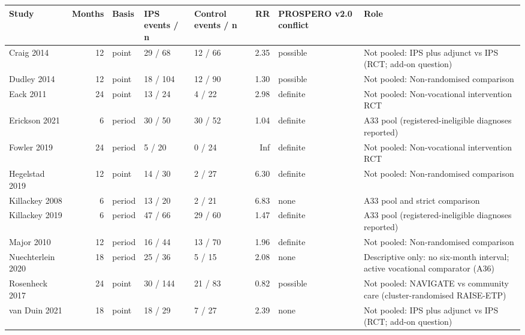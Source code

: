 
\begin{tabular}{lrlllrlp{5cm}}
\toprule
Study & Months & Basis & IPS events / n & Control events / n & RR & PROSPERO v2.0 conflict & Role\\
\midrule
Craig 2014 & 12 & point & 29 / 68 & 12 / 66 & 2.35 & possible & Not pooled: IPS plus adjunct vs IPS (RCT; add-on question)\\
Dudley 2014 & 12 & point & 18 / 104 & 12 / 90 & 1.30 & possible & Not pooled: Non-randomised comparison\\
Eack 2011 & 24 & point & 13 / 24 & 4 / 22 & 2.98 & definite & Not pooled: Non-vocational intervention RCT\\
Erickson 2021 & 6 & period & 30 / 50 & 30 / 52 & 1.04 & definite & A33 pool (registered-ineligible diagnoses reported)\\
Fowler 2019 & 24 & period & 5 / 20 & 0 / 24 & Inf & definite & Not pooled: Non-vocational intervention RCT\\
Hegelstad 2019 & 12 & point & 14 / 30 & 2 / 27 & 6.30 & definite & Not pooled: Non-randomised comparison\\
Killackey 2008 & 6 & period & 13 / 20 & 2 / 21 & 6.83 & none & A33 pool and strict comparison\\
Killackey 2019 & 6 & period & 47 / 66 & 29 / 60 & 1.47 & definite & A33 pool (registered-ineligible diagnoses reported)\\
Major 2010 & 12 & period & 16 / 44 & 13 / 70 & 1.96 & definite & Not pooled: Non-randomised comparison\\
Nuechterlein 2020 & 18 & period & 25 / 36 & 5 / 15 & 2.08 & none & Descriptive only: no six-month interval; active vocational comparator (A36)\\
Rosenheck 2017 & 24 & point & 30 / 144 & 21 / 83 & 0.82 & possible & Not pooled: NAVIGATE vs community care (cluster-randomised RAISE-ETP)\\
van Duin 2021 & 18 & point & 18 / 29 & 7 / 27 & 2.39 & none & Not pooled: IPS plus adjunct vs IPS (RCT; add-on question)\\
\bottomrule
\end{tabular}
